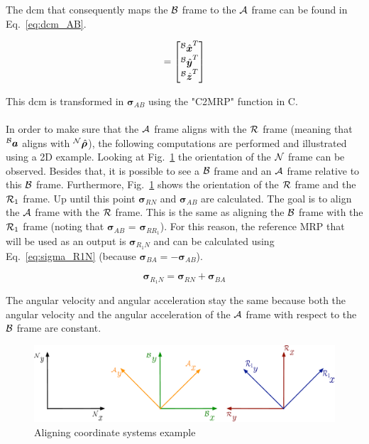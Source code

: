 \documentclass[]{AVSreport}
\begin{document}
The dcm that consequently maps the ${\cal B}$ frame to the ${\cal A}$ frame can be found in Eq.~\eqref{eq:dcm_AB}.

\begin{equation}
    [AB] = \begin{bmatrix}
            {^{\cal B}\hat{{\bm x}}}^{T}\\ 
            {^{\cal B}\hat{{\bm y}}}^{T}\\ 
            {^{\cal B}\hat{{\bm z}}}^{T}
            \end{bmatrix}
            \label{eq:dcm_AB}
\end{equation}

This dcm is transformed in ${\bm \sigma}_{AB}$ using the "C2MRP" function in C. \\
\\
In order to make sure that the ${\cal A}$ frame aligns with the ${\cal R}$ frame (meaning that $^{\cal B}{\bm a}$ aligns with $^{\cal N}\hat{{\bm \rho}}$), the following computations are performed and illustrated using a 2D example. Looking at Fig.~\ref{fig:coordinate_systems} the orientation of the ${\cal N}$ frame can be observed. Besides that, it is possible to see a ${\cal B}$ frame and an ${\cal A}$ frame relative to this ${\cal B}$ frame. Furthermore, Fig.~\ref{fig:coordinate_systems} shows the orientation of the ${\cal R}$ frame and the ${\cal R}_{1}$ frame. Up until this point ${\bm \sigma}_{RN}$ and ${\bm \sigma}_{AB}$ are calculated. The goal is to align the ${\cal A}$ frame with the ${\cal R}$ frame. This is the same as aligning the ${\cal B}$ frame with the ${\cal R}_{1}$ frame (noting that ${\bm \sigma}_{AB}$ = ${\bm \sigma}_{RR_{1}}$). For this reason, the reference MRP that will be used as an output is ${\bm \sigma}_{R_{1}N}$ and can be calculated using Eq.~\eqref{eq:sigma_R1N} (because ${\bm \sigma}_{BA} = - {\bm \sigma}_{AB}$).

\begin{equation}
    {\bm \sigma}_{R_{1}N} = {\bm \sigma}_{RN} + {\bm \sigma}_{BA}
    \label{eq:sigma_R1N}
\end{equation}

The angular velocity and angular acceleration stay the same because both the angular velocity and the angular acceleration of the ${\cal A}$ frame with respect to the ${\cal B}$ frame are constant.

\begin{figure}[htb]
	\centerline{
	\includegraphics[scale=0.5]{Figures/Coordinate_systems.pdf}
	}
	\caption{Aligning coordinate systems example}
	\label{fig:coordinate_systems}
\end{figure}
\end{document}
